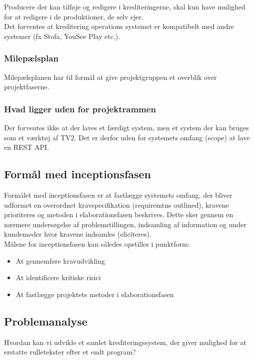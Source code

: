 \noindent
Producere der kan tilføje og redigere i krediteringerne, skal kun have mulighed for at redigere i de produktioner, de selv ejer.\\
Det forventes at kreditering operations systemet er kompatibelt med andre systemer (fx Stofa, YouSee Play etc.).

\subsubsection{Milepælsplan}
Milepælsplanen har til formål at give projektgruppen et overblik over projektfaserne.\\


\subsubsection{Hvad ligger uden for projektrammen}
Der forventes ikke at der laves et færdigt system, men et system der kan bruges som et værktøj af TV2. Det er derfor uden for systemets omfang (scope) at lave en REST API.

\subsection{Formål med inceptionsfasen}
Formålet med inceptionsfasen er at fastlægge systemets omfang, der bliver udformet en overordnet kravspecifikation (requiremtns outlined), kravene prioriteres og metoden i elaborationsfasen beskrives. Dette sker gennem en nærmere undersøgelse af problemstillingen, indsamling af information og under kundemøder hvor kravene indsamles (eliciteres).\\

\noindent
Målene for inceptionsfasen kan således opstilles i punktform:
\begin{itemize}
    \item At gennemføre kravudvikling
    \item At identificere kritiske risici
    \item At fastlægge projektets metoder i elaborationsfasen
\end{itemize}

\subsection{Problemanalyse}
Hvordan kan vi udvikle et samlet krediteringssystem, der giver mulighed for at erstatte rulletekster efter et endt program?

